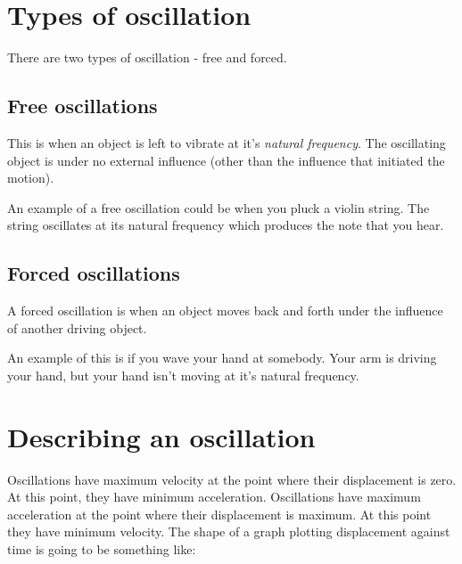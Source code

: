 \documentclass{article}
\begin{document}
\section*{Types of oscillation}
There are two types of oscillation - free and forced.
\subsection*{Free oscillations}
This is when an object is left to vibrate at it's \textit{natural frequency}. The oscillating object is under no external influence (other than the influence that initiated the motion). 

An example of a free oscillation could be when you pluck a violin string. The string oscillates at its natural frequency which produces the note that you hear.
\subsection*{Forced oscillations}
A forced oscillation is when an object moves back and forth under the influence of another driving object.

An example of this is if you wave your hand at somebody. Your arm is driving your hand, but your hand isn't moving at it's natural frequency.

\section*{Describing an oscillation}
Oscillations have maximum velocity at the point where their displacement is zero. At this point, they have minimum acceleration.
Oscillations have maximum acceleration at the point where their displacement is maximum. At this point they have minimum velocity.
The shape of a graph plotting displacement against time is going to be something like:

\end{document}
